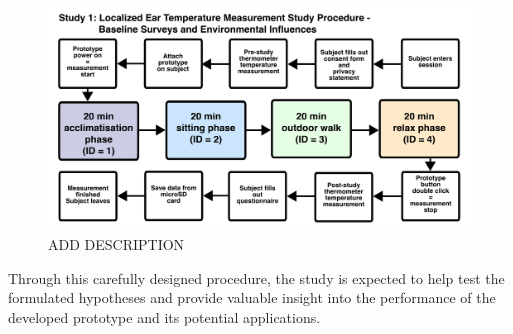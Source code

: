 \begin{figure}[t]
    \centering
    \includegraphics[width=\textwidth]{thesis-doc/images/study1/Procedure_new.pdf}
    \caption{ADD DESCRIPTION}
    \label{fig:design:study1:procedure}
\end{figure}

Through this carefully designed procedure, the study is expected to help test the formulated hypotheses and provide valuable insight into the performance of the developed prototype and its potential applications.


